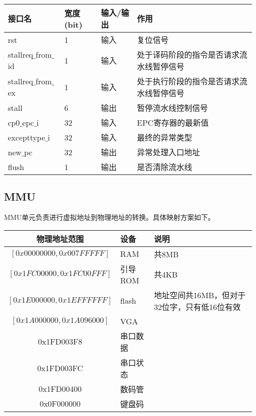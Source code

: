 \quad
	\begin{longtable}{|l|l|l|l|}
		\hline
		接口名 & 宽度(bit) & 输入/输出 & 作用 \\
		\hline
		rst & 1 & 输入 & 复位信号 \\
		\hline
		stallreq$\_$from$\_$id & 1 & 输入 & 处于译码阶段的指令是否请求流水线暂停信号 \\
		\hline
		stallreq$\_$from$\_$ex & 1 & 输入 & 处于执行阶段的指令是否请求流水线暂停信号 \\
		\hline
		stall & 6 & 输出 & 暂停流水线控制信号 \\
		\hline
		cp0$\_$epc$\_$i & 32 & 输入 & EPC寄存器的最新值 \\
		\hline
		excepttype$\_$i & 32 & 输入 & 最终的异常类型 \\
		\hline
		new$\_$pc & 32 & 输出 & 异常处理入口地址 \\
		\hline
		flush & 1 & 输出 & 是否清除流水线 \\
		\hline
	\end{longtable}

\subsection{MMU}

MMU单元负责进行虚拟地址到物理地址的转换。具体映射方案如下。

\begin{table}[H]
\centering
\begin{tabular}{cll}
\hline
物理地址范围&设备&说明\\
\hline
$\left[ 0x00000000, 0x007FFFFF\right] $&RAM&共8MB\\
$\left[ 0x1FC00000, 0x1FC00FFF\right] $&引导ROM&共4KB\\
$\left[ 0x1E000000, 0x1EFFFFFF\right] $&flash&地址空间共16MB，但对于32位字，只有低16位有效\\
$\left[ 0x1A000000, 0x1A096000\right] $&VGA&\\
0x1FD003F8&串口数据&\\
0x1FD003FC&串口状态&\\
0x1FD00400&数码管&\\
0x0F000000&键盘码&\\
\hline
\end{tabular}
\end{table}

